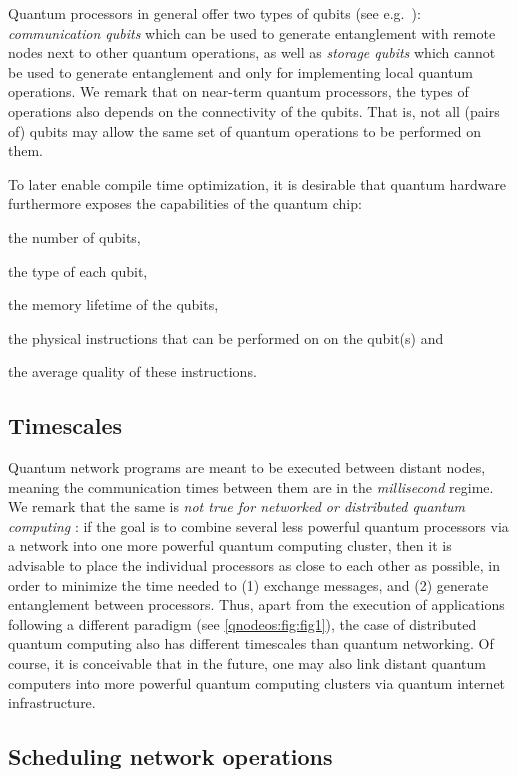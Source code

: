 Quantum processors in general offer two types of qubits (see e.g.~\cite{dahlberg_2019_egp}): \emph{communication qubits} which can be used to generate entanglement with remote nodes next to other quantum operations, as well as \emph{storage qubits} which cannot be used to generate entanglement and only for implementing local quantum operations. We remark that on near-term quantum processors, the types of operations also depends on the connectivity of the qubits. That is, not all (pairs of) qubits may allow the same set of quantum operations to be performed on them.

To later enable compile time optimization, it is desirable that quantum hardware furthermore exposes the capabilities of the quantum chip:
%
\begin{inlinelist}
\item the number of qubits,
\item the type of each qubit, 
\item the memory lifetime of the qubits,
\item the physical instructions that can be performed on on the qubit(s) and
\item the average quality of these instructions.
\end{inlinelist}

\subsection{Timescales}

Quantum network programs are meant to be executed between distant nodes, meaning the communication times between them are in the \emph{millisecond} regime. We remark that the same is \emph{not true for networked or distributed quantum computing }: if the goal is to combine several less powerful quantum processors via a network into one more powerful quantum computing cluster, then it is advisable to place the individual processors as close to each other as possible, in order to minimize the time needed to (1) exchange messages, and (2) generate entanglement between processors. Thus, apart from the execution of applications following a different paradigm (see \cref{qnodeos:fig:fig1}),
the case of distributed quantum computing also has different timescales than quantum networking. Of course, it is conceivable that in the future, one may also link distant quantum computers into more powerful quantum computing clusters via quantum internet infrastructure.


\subsection{Scheduling network operations}

